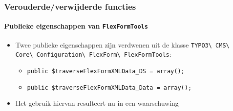\begin{frame}[fragile]
	\frametitle{Verouderde/verwijderde functies}
	\framesubtitle{Publieke eigenschappen van \texttt{FlexFormTools}}

	\begin{itemize}
		\item Twee publieke eigenschappen zijn verdwenen uit de klasse
			\texttt{TYPO3\textbackslash
				CMS\textbackslash
				Core\textbackslash
				Configuration\textbackslash
				FlexForm\textbackslash
				FlexFormTools}:

		\begin{itemize}
			\item \texttt{public \$traverseFlexFormXMLData\_DS = array();}
			\item \texttt{public \$traverseFlexFormXMLData\_Data = array();}
		\end{itemize}

		\item Het gebruik hiervan resulteert nu in een waarschuwing

	\end{itemize}

\end{frame}



